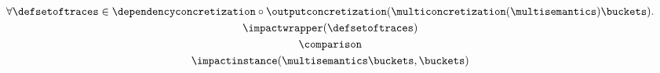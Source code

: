 \begin{gather*}
  \forall
    \defsetoftraces\in \dependencyconcretization \circ \outputconcretization(\multiconcretization(\multisemantics)\buckets). \\
  \impactwrapper(
    \defsetoftraces
    ) \\
  \comparison \\
  \impactinstance(\multisemantics\buckets, \buckets)
\end{gather*}
